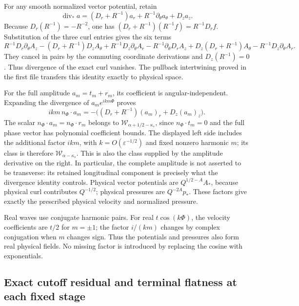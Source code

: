 \documentclass[10pt,a4paper]{article}
\begin{document}
For any smooth normalized vector potential, retain \[
\operatorname{div}_*a=(D_r+R^{-1})a_r+R^{-1}\partial_\theta a_\theta+D_za_z.
\] Because \(D_r(R^{-1})=-R^{-2}\), one has \((D_r+R^{-1})(R^{-1}f)=R^{-1}D_rf\). Substitution of the three curl entries gives the six terms \[
R^{-1}D_r\partial_\theta A_z
-(D_r+R^{-1})D_zA_\theta
+R^{-1}D_z\partial_\theta A_r
-R^{-1}\partial_\theta D_rA_z
+D_z(D_r+R^{-1})A_\theta
-R^{-1}D_z\partial_\theta A_r.
\] They cancel in pairs by the commuting coordinate derivations and \(D_z(R^{-1})=0\). Thus divergence of the exact curl vanishes. The pullback intertwining proved in the first file transfers this identity exactly to physical space.

For the full amplitude \(a_m=t_m+r_m\), its coefficient is angular-independent. Expanding the divergence of \(a_me^{ikm\Phi}\) proves \[
ikm\,n_\Phi\cdot a_m
=-\big((D_r+R^{-1})(a_m)_r+D_z(a_m)_z\big).
\] The scalar \(n_\Phi\cdot a_m=n_\Phi\cdot r_m\) belongs to \(\mathcal W_{\alpha+1/2-\kappa_s}\), since \(n_\Phi\cdot t_m=0\) and the full phase vector has polynomial coefficient bounds. The displayed left side includes the additional factor \(ikm\), with \(k=O(\varepsilon^{-1/2})\) and fixed nonzero harmonic \(m\); its class is therefore \(\mathcal W_{\alpha-\kappa_s}\). This is also the class supplied by the amplitude derivative on the right. In particular, the complete amplitude is not asserted to be transverse: its retained longitudinal component is precisely what the divergence identity controls. Physical vector potentials are \(Q^{1/2-A}A_*\), because physical curl contributes \(Q^{-1/2}\); physical pressures are \(Q^{-2A}p_*\). These factors give exactly the prescribed physical velocity and normalized pressure.

Real waves use conjugate harmonic pairs. For real \(t\cos(k\Phi)\), the velocity coefficients are \(t/2\) for \(m=\pm1\); the factor \(i/(km)\) changes by complex conjugation when \(m\) changes sign. Thus the potentials and pressures also form real physical fields. No missing factor is introduced by replacing the cosine with exponentials.

\subsection{Exact cutoff residual and terminal flatness at each fixed stage}\label{exact-cutoff-residual-and-terminal-flatness-at-each-fixed-stage}
\end{document}
